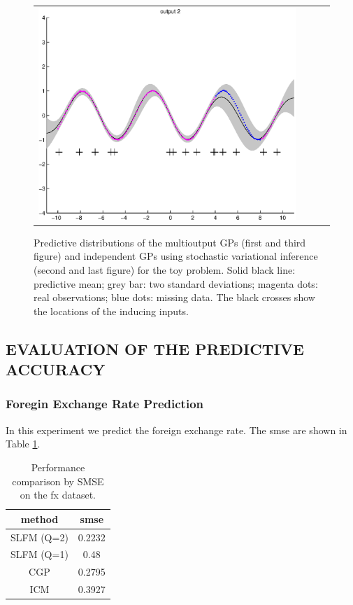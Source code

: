 \begin{figure}
\begin{tabular}{cccc}
\includegraphics[scale=0.25]{figures/toy-svigp-y2.eps}
\end{tabular}
\caption{Predictive distributions of the multioutput GPs (first and third figure) and independent GPs using stochastic variational inference (second and last figure) for the  toy problem. Solid black line: predictive mean; grey bar: two standard deviations; magenta dots: real observations; blue dots: missing data. The black crosses show the locations of the inducing inputs.}
\label{fig:toy}
\end{figure}

\subsection{EVALUATION OF THE PREDICTIVE ACCURACY}
\subsubsection{Foregin Exchange Rate Prediction}
In this experiment we predict the foreign exchange rate.
The smse are shown in Table \ref{tab:fx}.

\begin{table}[h]
\caption{Performance comparison by SMSE on the fx dataset.}
\label{tab:fx}
\begin{center}
\begin{tabular}{c|c}
method & smse \\ \hline
SLFM (Q=2) & 0.2232 \\
SLFM (Q=1) & 0.48 \\
CGP & 0.2795 \\
ICM & 0.3927
\end{tabular}
\end{center}
\end{table}

